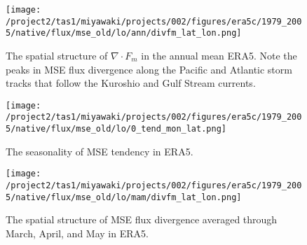 \documentclass{article}
\begin{document}
\begin{figure}
    \texttt{[image: /project2/tas1/miyawaki/projects/002/figures/era5c/1979\_2005/native/flux/mse\_old/lo/ann/divfm\_lat\_lon.png]}
    \caption{The spatial structure of $\nabla\cdot F_m$ in the annual mean ERA5. Note the peaks in MSE flux divergence along the Pacific and Atlantic storm tracks that follow the Kuroshio and Gulf Stream currents.}
    \label{fig:divfm-zon-era5}
\end{figure}

\begin{figure}
    \texttt{[image: /project2/tas1/miyawaki/projects/002/figures/era5c/1979\_2005/native/flux/mse\_old/lo/0\_tend\_mon\_lat.png]}
    \caption{The seasonality of MSE tendency in ERA5.}
    \label{fig:tend-era5}
\end{figure}

\begin{figure}
    \texttt{[image: /project2/tas1/miyawaki/projects/002/figures/era5c/1979\_2005/native/flux/mse\_old/lo/mam/divfm\_lat\_lon.png]}
    \caption{The spatial structure of MSE flux divergence averaged through March, April, and May in ERA5.}
    \label{fig:divfm-zon-mam-era5}
\end{figure}



\end{document}
